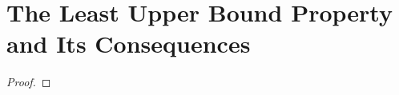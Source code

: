 \section{The Least Upper Bound Property and Its Consequences}
\label{lub}

\addtocounter{theorem}{12}

\begin{theorem} %
	\label{lub:t:dens}
	\TBD
\end{theorem}


\addtocounter{exercise}{11}
\Newpage
\begin{exercise} %
	\label{lub:e:12}
	\TBD
\end{exercise}

\begin{proof}
	\TBD
\end{proof}
